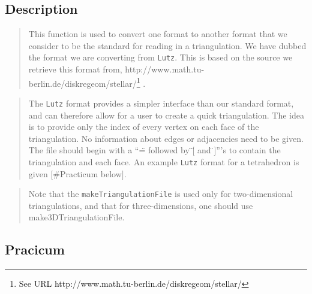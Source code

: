 \documentclass[10pt]{article}%
\begin{document}
\subsection*{Description}

\begin{quotation} This function is used to convert one format to another format that we consider to be the standard for reading in a triangulation. We have dubbed the format we are converting from \texttt{Lutz}. This is based on the source we retrieve this format from, http://www.math.tu-berlin.de/diskregeom/stellar/\footnote{See URL http://www.math.tu-berlin.de/diskregeom/stellar/} . \end{quotation}
\begin{quotation} The \texttt{Lutz} format provides a simpler interface than our standard format, and can therefore allow for a user to create a quick triangulation. The idea is to provide only the index of every vertex on each face of the triangulation. No information about edges or adjacencies need to be given. The file should begin with a ``=\"{} followed by \"{}\mbox{$[$}\"{} and \"{}\mbox{$]$}'''s to contain the triangulation and each face. An example \texttt{Lutz} format for a tetrahedron is given \mbox{$[$}\#Practicum below\mbox{$]$}. \end{quotation}
\begin{quotation} Note that the \texttt{makeTriangulationFile} is used only for two-dimensional triangulations, and that for three-dimensions, one should use make3DTriangulationFile.\end{quotation}

\subsection*{Pracicum}
\end{document}
